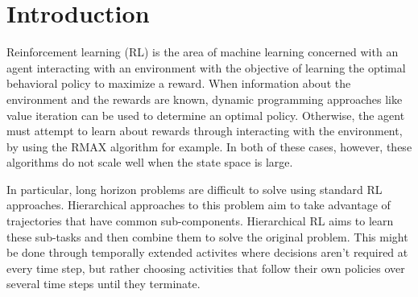 \section{Introduction}

Reinforcement learning (RL) is the area of machine learning concerned with an agent interacting with an environment with the objective of learning the optimal behavioral policy to maximize a reward. When information about the environment and the rewards are known, dynamic programming approaches like value iteration can be used to determine an optimal policy. Otherwise, the agent must attempt to learn about rewards through interacting with the environment, by using the RMAX algorithm for example. In both of these cases, however, these algorithms do not scale well when the state space is large. 

In particular, long horizon problems are difficult to solve using standard RL approaches. Hierarchical approaches to this problem aim to take advantage of trajectories that have common sub-components. Hierarchical RL aims to learn these sub-tasks and then combine them to solve the original problem. This might be done through temporally extended activites where decisions aren't required at every time step, but rather choosing activities that follow their own policies over several time steps until they terminate. 

